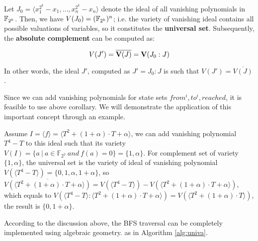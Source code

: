 Let $J_0 = \langle x_1^{2^k} - x_1, \dots, x_n^{2^k} - x_n \rangle$
denote the ideal of all vanishing polynomials in ${\mathbb{F}}_{2^k}$. Then, we have
$V(J_0) = ({\mathbb{F}}_{2^k})^{n}$; i.e. the variety of vanishing ideal contains
all possible valuations of variables, so it constitutes the {\bf
  universal set}. Subsequently, the {\bf absolute complement} can be
computed as:

\begin{Corollary}
$$V(J') = \overline{{\bf V}(J)} = {\bf V}(J_0:J)$$

\end{Corollary}

In other words, the ideal $J'$, computed as $J' = J_0:J$ is such that
$V(J') =\overline{V(J)}$. 

Since we can add vanishing polynomials for state sets
$from^i, to^i, reached$, it is feasible to use above corollary. We
will demonstrate the application of this important concept through an
example. 
% 


Assume $I = \langle f\rangle  = \langle T^2 +
(1+\alpha)\cdot T+\alpha\rangle $,  we can add vanishing polynomial
$T^4 - T$ to this ideal such that its variety  $V(I) = \{a\ |\ a \in
\mathbb{F}_{2^2}\ and\ f(a) = 0\} = \{1, \alpha\}$. For complement set
of variety $\{1, \alpha\}$, the universal set is the variety of ideal
of vanishing polynomial $V(\langle T^4-T\rangle ) =
\{0,1,\alpha,1+\alpha\}$, 
so $\overline{V(\langle T^2 + (1+\alpha)\cdot T+\alpha\rangle )} = V(\langle T^4-T\rangle ) - V(\langle T^2 + (1+\alpha)\cdot T+\alpha\rangle )$,
which equals to $V(\langle T^4-T\rangle :\langle T^2 + (1+\alpha)\cdot T+\alpha\rangle ) = V(\langle T^2+(1+\alpha)\cdot T\rangle )$,
the result is $\{0,1+\alpha\}$.

According to the discussion above, the BFS traversal can be completely implemented using algebraic geometry.
as in Algorithm \ref{alg:univa}.

